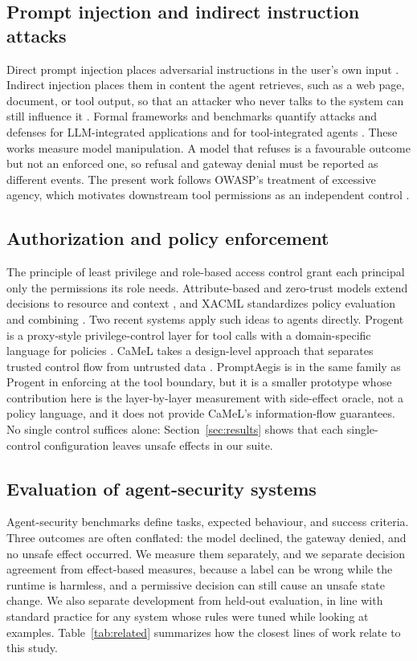 \documentclass[3p,twocolumn]{elsarticle}
\begin{document}
\subsection{Prompt injection and indirect instruction attacks}
Direct prompt injection places adversarial instructions in the user's own input \cite{perez2022}. Indirect injection places them in content the agent retrieves, such as a web page, document, or tool output, so that an attacker who never talks to the system can still influence it \cite{greshake2023}. Formal frameworks and benchmarks quantify attacks and defenses for LLM-integrated applications \cite{formalpi2023,bipia2023} and for tool-integrated agents \cite{injecagent2024,asb2024}. These works measure model manipulation. A model that refuses is a favourable outcome but not an enforced one, so refusal and gateway denial must be reported as different events. The present work follows OWASP's treatment of excessive agency, which motivates downstream tool permissions as an independent control \cite{owasp2025}.

\subsection{Authorization and policy enforcement}
The principle of least privilege \cite{saltzer1975} and role-based access control \cite{sandhu1996} grant each principal only the permissions its role needs. Attribute-based and zero-trust models extend decisions to resource and context \cite{nistabac2019,nistzt2020}, and XACML standardizes policy evaluation and combining \cite{xacml2013}. Two recent systems apply such ideas to agents directly. Progent is a proxy-style privilege-control layer for tool calls with a domain-specific language for policies \cite{progent2025}. CaMeL takes a design-level approach that separates trusted control flow from untrusted data \cite{camel2025}. PromptAegis is in the same family as Progent in enforcing at the tool boundary, but it is a smaller prototype whose contribution here is the layer-by-layer measurement with side-effect oracle, not a policy language, and it does not provide CaMeL's information-flow guarantees. No single control suffices alone: Section~\ref{sec:results} shows that each single-control configuration leaves unsafe effects in our suite.

\subsection{Evaluation of agent-security systems}
Agent-security benchmarks define tasks, expected behaviour, and success criteria. Three outcomes are often conflated: the model declined, the gateway denied, and no unsafe effect occurred. We measure them separately, and we separate decision agreement from effect-based measures, because a label can be wrong while the runtime is harmless, and a permissive decision can still cause an unsafe state change. We also separate development from held-out evaluation, in line with standard practice for any system whose rules were tuned while looking at examples. Table~\ref{tab:related} summarizes how the closest lines of work relate to this study.
\end{document}
